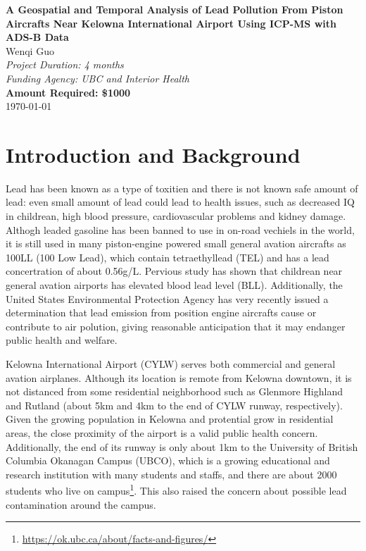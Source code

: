 \documentclass[12pt]{article}
\begin{document}
\begin{center}
    \Large{\textbf{A Geospatial and Temporal Analysis of Lead Pollution From Piston Aircrafts Near Kelowna International Airport Using ICP-MS with ADS-B Data}}\\
    \vspace{1cm}
    \large{Wenqi Guo}\\
    \vspace{0.5cm}
    \textit{Project Duration: 4 months}\\
    \vspace{0.5cm}
    \textit{Funding Agency: UBC and Interior Health}\\
    \vspace{0.5cm}
    \textbf{Amount Required: \$1000}\\
    \vspace{1cm}
    \vspace{1cm}
    \today
\end{center}
\newpage

\section{Introduction and Background}
Lead has been known as a type of toxitien and there is not known safe amount of lead: even small amount of lead could lead to health issues, such as decreased IQ in childrean, high blood pressure, cardiovascular problems and kidney damage. \cite{world_health_organization_lead_2023} Althogh leaded gasoline has been banned to use in on-road vechiels in the world, it is still used in many piston-engine powered small general avation aircrafts as 100LL (100 Low Lead), which contain tetraethyllead (TEL) and has a lead concertration of about 0.56g/L. 
\cite{noauthor_safety_2021} Pervious study has shown that childrean near general avation airports has elevated blood lead level (BLL). \cite{miranda_geospatial_2011} \cite{zahran_leaded_2023} \cite{mills_lead_2022} \cite{zahran_effect_2017} Additionally, the United States Environmental Protection Agency has very recently issued a determination that lead emission from position engine aircrafts cause or contribute to air polution, giving reasonable anticipation that it may endanger public health and welfare.  \cite{us_epa_epa_2023} 

Kelowna International Airport (CYLW) serves both commercial and general avation airplanes. Although its location is remote from Kelowna downtown, it is not distanced from some residential neighborhood such as Glenmore Highland and Rutland (about 5km and 4km to the end of CYLW runway, respectively). Given the growing population in Kelowna and protential grow in residential areas, the close proximity of the airport is a valid public health concern. Additionally, the end of its runway is only about 1km to the University of British Columbia Okanagan Campus (UBCO), which is a growing educational and research institution with many students and staffs, and there are about 2000 students who live on campus\footnote{\url{https://ok.ubc.ca/about/facts-and-figures/}}. This also raised the concern about possible lead contamination around the campus.
\end{document}
